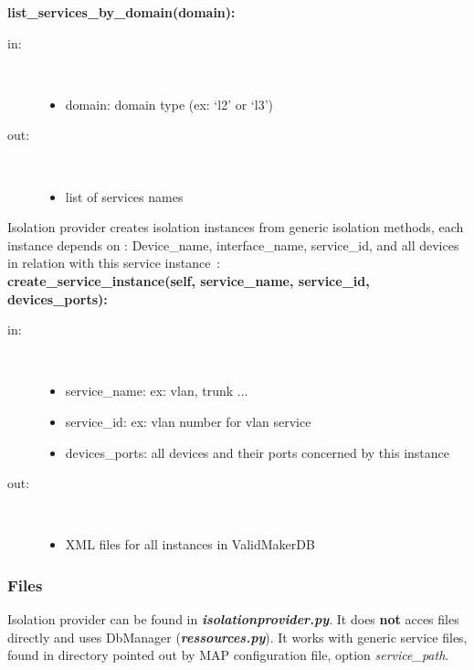 \textbf{list\_services\_by\_domain(domain):}
\begin{description}
    \item[in:] \hfill \\
        \begin{itemize}
            \item domain: domain type (ex: ‘l2’ or ‘l3’)
        \end{itemize}
    \item[out:] \hfill \\
        \begin{itemize}
            \item list of services names
        \end{itemize}
\end{description}
Isolation provider creates isolation instances from generic isolation methods, each instance depends on : Device\_name, interface\_name, service\_id, and all devices in relation with this service instance~:\\[1\baselineskip]
\textbf{create\_service\_instance(self, service\_name, service\_id, devices\_ports):}
\begin{description}
    \item[in:] \hfill \\
        \begin{itemize}
            \item service\_name: ex: vlan, trunk ...
            \item service\_id: ex: vlan number for vlan service
            \item devices\_ports: all devices and their ports concerned by this instance
        \end{itemize}
    \item[out:] \hfill \\
        \begin{itemize}
            \item XML files for all instances in ValidMakerDB
        \end{itemize}
\end{description}

\subsubsection{Files}
Isolation provider can be found in \emph{\textbf{isolationprovider.py}}. It does \textbf{not} acces files directly and uses DbManager (\emph{\textbf{ressources.py}}). It works with generic service files, found in directory pointed out by MAP configuration file, option \emph{service\_path}.

